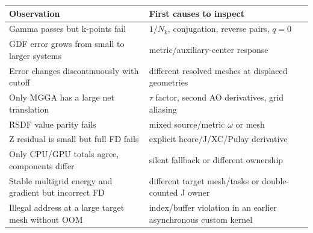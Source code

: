 \begin{center}
\begin{longtable}{>{\raggedright\arraybackslash}p{}
                  >{\raggedright\arraybackslash}p{}}
\toprule
Observation & First causes to inspect \\
\midrule
Gamma passes but k-points fail & $1/N_k$, conjugation, reverse pairs, $q=0$ \\
GDF error grows from small to larger systems & metric/auxiliary-center response \\
Error changes discontinuously with cutoff & different resolved meshes at displaced geometries \\
Only MGGA has a large net translation & $\tau$ factor, second AO derivatives, grid aliasing \\
RSDF value parity fails & mixed source/metric $\omega$ or mesh \\
Z residual is small but full FD fails & explicit hcore/J/XC/Pulay derivative \\
Only CPU/GPU totals agree, components differ & silent fallback or different ownership \\
Stable multigrid energy and gradient but incorrect FD & different target mesh/tasks or double-counted J owner \\
Illegal address at a large target mesh without OOM & index/buffer violation in an earlier asynchronous custom kernel \\
\bottomrule
\end{longtable}
\end{center}
